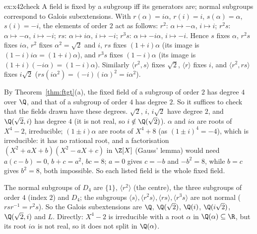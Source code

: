 \begin{solution}{ex:x42check}
\idea A field is fixed by a subgroup iff its generators are; normal subgroups correspond to Galois subextensions.
\writeup With $r(\alpha)=i\alpha$, $r(i)=i$, $s(\alpha)=\alpha$, $s(i)=-i$, the elements of order $2$ act as follows: $r^2$: $\alpha\mapsto-\alpha$, $i\mapsto i$; $r^2s$: $\alpha\mapsto-\alpha$, $i\mapsto-i$; $rs$: $\alpha\mapsto i\alpha$, $i\mapsto-i$; $r^3s$: $\alpha\mapsto-i\alpha$, $i\mapsto-i$. Hence $s$ fixes $\alpha$, $r^2s$ fixes $i\alpha$, $r^2$ fixes $\alpha^2=\sqrt2$ and $i$, $rs$ fixes $(1+i)\alpha$ (its image is $(1-i)i\alpha=(1+i)\alpha$), and $r^3s$ fixes $(1-i)\alpha$ (its image is $(1+i)(-i\alpha)=(1-i)\alpha$). Similarly $\langle r^2,s\rangle$ fixes $\sqrt2$, $\langle r\rangle$ fixes $i$, and $\langle r^2,rs\rangle$ fixes $i\sqrt2$ ($rs(i\alpha^2)=(-i)(i\alpha)^2=i\alpha^2$).

By Theorem~\ref{thm:ftgt}(a), the fixed field of a subgroup of order $2$ has degree $4$ over $\Q$, and that of a subgroup of order $4$ has degree $2$. So it suffices to check that the fields drawn have these degrees. $\sqrt2$, $i$, $i\sqrt2$ have degree $2$, and $\Q(\sqrt2,i)$ has degree $4$ (it is not real, so $i\notin\Q(\sqrt2)$). $\alpha$ and $i\alpha$ are roots of $X^4-2$, irreducible; $(1\pm i)\alpha$ are roots of $X^4+8$ (as $(1\pm i)^4=-4$), which is irreducible: it has no rational root, and a factorisation $(X^2+aX+b)(X^2-aX+c)$ in $\Z[X]$ (Gauss' lemma) would need $a(c-b)=0$, $b+c=a^2$, $bc=8$; $a=0$ gives $c=-b$ and $-b^2=8$, while $b=c$ gives $b^2=8$, both impossible. So each listed field is the whole fixed field.

The normal subgroups of $D_4$ are $\{1\}$, $\langle r^2\rangle$ (the centre), the three subgroups of order $4$ (index $2$) and $D_4$; the subgroups $\langle s\rangle,\langle r^2s\rangle,\langle rs\rangle,\langle r^3s\rangle$ are not normal ($rsr^{-1}=r^2s$). So the Galois subextensions are $\Q$, $\Q(\sqrt2)$, $\Q(i)$, $\Q(i\sqrt2)$, $\Q(\sqrt2,i)$ and $L$. Directly: $X^4-2$ is irreducible with a root $\alpha$ in $\Q(\alpha)\subseteq\R$, but its root $i\alpha$ is not real, so it does not split in $\Q(\alpha)$.
\end{solution}

